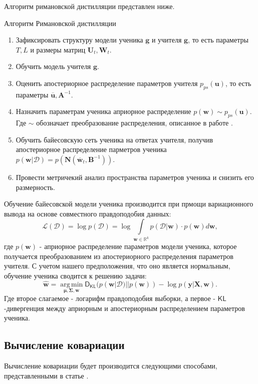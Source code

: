 \documentclass[12pt, twoside]{article}
\DeclareMathOperator*{\argmin}{arg\,min}
\begin{document}
Алгоритм римановской дистилляции представлен ниже.

\begin{algorithm}[H] 
         \caption{Алгоритм Римановской дистилляции}\label{alg:riman_distil} 
         \begin{enumerate}
             \item Зафиксировать структуру модели ученика $\mathbf{g}$ и учителя $\mathbf{g}$, то есть параметры $T, L$ и размеры матриц $\mathbf{U}_t, \mathbf{W}_t$.
             \item Обучить модель учителя $\mathbf{g}$.
            \item Оценить апостериорное распределение параметров учителя $p_{ps}(\mathbf{u})$, то есть параметры $\mathbf{\overline{u}}, \mathbf{A}^{-1}$.
            \item Назначить параметрам ученика априорное распределение $p(\mathbf{w}) \sim p_{ps}(\mathbf{u})$. Где $\sim$ обозначает преобразование распределения, описанное в работе \citep{grabovoy2021bayesian}.
            \item Обучить байесовскую сеть ученика на ответах учителя, получив апостериорное распределение парметров ученика $p(\mathbf{w}|\mathcal{D}) = p(\mathbf{N}(\mathbf{\overline{w}}_t, \mathbf{B}^{-1}))$.
            \item Провести метричекий анализ пространства параметров ученика и снизить его размерность.
         \end{enumerate}
 \end{algorithm}

Обучение байесовской модели ученика производится при прмощи вариационного вывода на основе совместного правдоподобия данных:
\[
\mathcal{L}(\mathcal{D}) = \log p(\mathcal{D}) = \log \int \limits_{\mathbf{w} \in \mathbb{R}^{k}}p(\mathcal{D}|\mathbf{w}) \cdot p(\mathbf{w}) d\mathbf{w},
\] где $p(\mathbf{w})$ - априорное распределение параметров модели ученика, которое получается преобразованием из апостериорного распределения параметров учителя. С учетом нашего предположения, что оно является нормальным, обучение ученика сводится к решению задачи:
\[
\mathbf{\widehat{w}} = \argmin \limits_{\mathbf{\mu}, \mathbf{\Sigma}, \mathbf{w}} \mathsf{D}_{\mathsf{KL}}(p(\mathbf{w}|\mathcal{D})||p(\mathbf{w})) - \log p(\mathbf{y}|\mathbf{X}, \mathbf{w}).
\] Где второе слагаемое - логарифм правдоподобия выборки, а первое - $\mathsf{KL}$-дивергенция между априорным и апостериорным распределением параметров ученика.


\subsection{Вычисление ковариации}
Вычисление ковариации будет производится следующими способами, представленными в статье \citep{chen2020statistical}.
\end{document}
